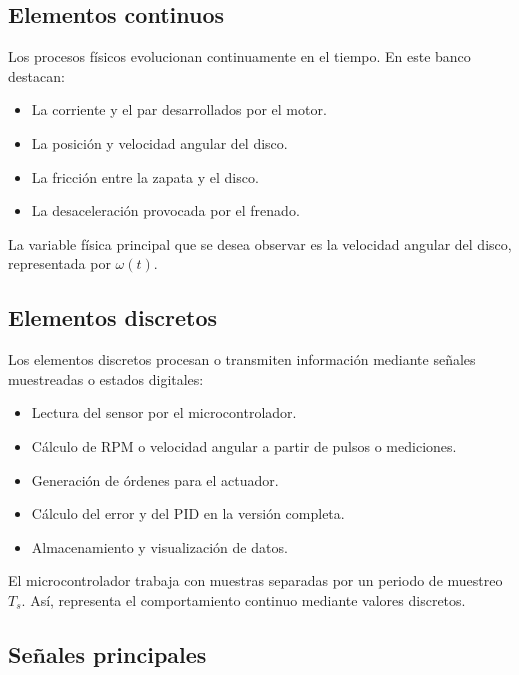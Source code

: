 \documentclass[9pt,a4paper,twocolumn]{extarticle}
\providecommand{\tightlist}{%
    \setlength{\itemsep}{0pt}%
    \setlength{\parskip}{0pt}%
}
\begin{document}
\subsection{Elementos continuos}\label{elementos-continuos}

Los procesos físicos evolucionan continuamente en el tiempo. En este
banco destacan:

\begin{itemize}
\tightlist
\item
  La corriente y el par desarrollados por el motor.
\item
  La posición y velocidad angular del disco.
\item
  La fricción entre la zapata y el disco.
\item
  La desaceleración provocada por el frenado.
\end{itemize}

La variable física principal que se desea observar es la velocidad
angular del disco, representada por \(\omega(t)\).

\subsection{Elementos discretos}\label{elementos-discretos}

Los elementos discretos procesan o transmiten información mediante
señales muestreadas o estados digitales:

\begin{itemize}
\tightlist
\item
  Lectura del sensor por el microcontrolador.
\item
  Cálculo de RPM o velocidad angular a partir de pulsos o mediciones.
\item
  Generación de órdenes para el actuador.
\item
  Cálculo del error y del PID en la versión completa.
\item
  Almacenamiento y visualización de datos.
\end{itemize}

El microcontrolador trabaja con muestras separadas por un periodo de
muestreo \(T_s\). Así, representa el comportamiento continuo mediante
valores discretos.

\subsection{Señales principales}\label{seuxf1ales-principales}
\end{document}
